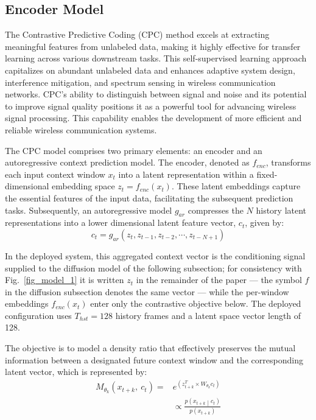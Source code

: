 \documentclass[lettersize,journal]{IEEEtran}
\begin{document}
\subsection{Encoder Model}
The Contrastive Predictive Coding (CPC) method excels at extracting meaningful features from unlabeled data, making it highly effective for transfer learning across various downstream tasks. This self-supervised learning approach capitalizes on abundant unlabeled data and enhances adaptive system design, interference mitigation, and spectrum sensing in wireless communication networks. CPC's ability to distinguish between signal and noise and its potential to improve signal quality positions it as a powerful tool for advancing wireless signal processing. This capability enables the development of more efficient and reliable wireless communication systems.

The CPC model comprises two primary elements: an encoder and an autoregressive context prediction model. The encoder, denoted as $f_{enc}$, transforms each input context window $x_t$ into a latent representation within a fixed-dimensional embedding space $z_t=f_{enc}\left(x_t\right)$. These latent embeddings capture the essential features of the input data, facilitating the subsequent prediction tasks. Subsequently, an autoregressive model $g_{ar}$ compresses the $N$ history latent representations into a lower dimensional latent feature vector, $c_t$, given by:
\begin{equation*}
    c_t=g_{ar}\left(z_t,z_{t-1},z_{t-2},\cdots,z_{t-N+1}\right)
\end{equation*}

In the deployed system, this aggregated context vector is the conditioning signal supplied to the diffusion model of the following subsection; for consistency with Fig.~\ref{fig_model_1} it is written $z_t$ in the remainder of the paper — the symbol $f$ in the diffusion subsection denotes the same vector — while the per-window embeddings $f_{enc}\left(x_t\right)$ enter only the contrastive objective below. The deployed configuration uses $T_{hst}=128$ history frames and a latent space vector length of 128.

The objective is to model a density ratio that effectively preserves the mutual information between a designated future context window and the corresponding latent vector, which is represented by:
\begin{equation}
\begin{aligned}
    M_{\theta_k}\left(x_{t+k},\ c_t\right) = &e^{\left(z_{t+k}^T \times W_{\theta_k} c_t\right)}\\
    &\propto\frac{p\left(x_{t+k}\middle| c_t\right)}{p\left(x_{t+k}\right)}
\end{aligned}
\end{equation}
\end{document}
